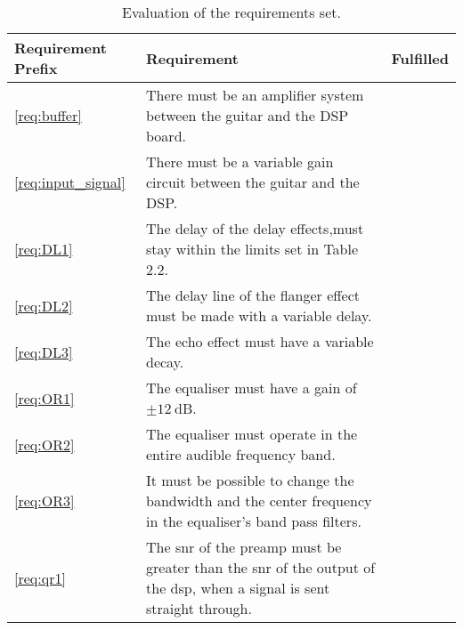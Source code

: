 \begin{table}[h]
	\centering
	\caption{Evaluation of the requirements set.}
	\label{tab:allreqs}
	\begin{tabularx}{\textwidth}{lXc}
		\textbf{Requirement Prefix}            & \textbf{Requirement}                                                                                                                                           & \textbf{Fulfilled} \\ \toprule \rowcolor{lightGrey}
		\autoref{req:buffer}        & There must be an amplifier system between the guitar and the DSP board.                                                                               & \cmark      \\
		\autoref{req:input_signal} & There must be a variable gain circuit between the guitar and the DSP.                                                                                 & \cmark    \\ \rowcolor{lightGrey}
		\autoref{req:DL1}           & The delay of the delay effects,must stay within the limits set in Table 2.2.                                                                          & \cmark    \\
		\autoref{req:DL2}           & The delay line of the flanger effect must be made with a variable delay.                                                                              & \cmark    \\ \rowcolor{lightGrey}
		\autoref{req:DL3}           & The echo effect must have a variable decay.                                                                                                           & \cmark    \\
		\autoref{req:OR1}           & The equaliser must have a gain of $\pm\SI{12}{\deci\bel}$.                                                                                            & \cmark    \\ \rowcolor{lightGrey}
		\autoref{req:OR2}           & The equaliser must operate in the entire audible frequency band.                                                                                      & \cmark    \\
		\autoref{req:OR3}           & It must be possible to change the bandwidth and the center frequency in the equaliser’s band pass filters.                                            & \cmark    \\ \rowcolor{lightGrey}
		\autoref{req:qr1}           & The \gls{snr} of the \gls{preamp} must be greater than the \gls{snr} of the output of the \gls{dsp}, when a signal is sent straight through. & \cmark    \\

\end{tabularx}
\end{table}
